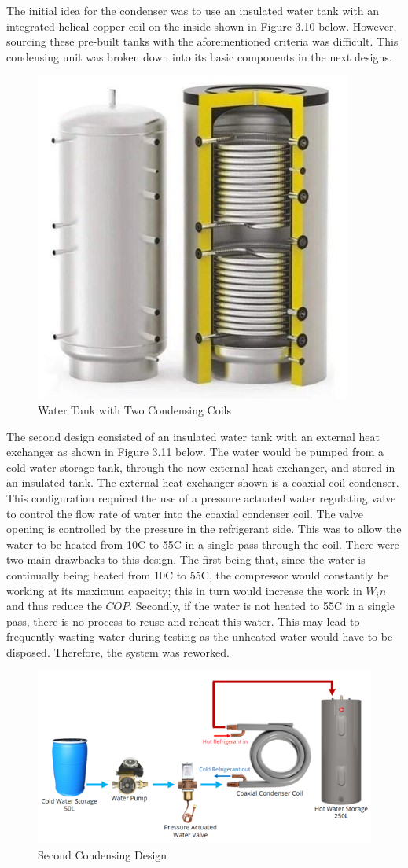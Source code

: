 \medskip
The initial idea for the condenser was to use an insulated water tank with an integrated helical copper coil on the inside shown in Figure 3.10 below. However, sourcing these pre-built tanks with the aforementioned criteria was difficult. This condensing unit was broken down into its basic components in the next designs.

\medskip
\begin{figure}[H]
    \centering
    \includegraphics[width=5 cm]{images/water_tank_condenser.jpg}
    \caption{Water Tank with Two Condensing Coils \cite{water_tank_selection}}
\end{figure}

\medskip
The second design consisted of an insulated water tank with an external heat exchanger as shown in Figure 3.11 below. The water would be pumped from a cold-water storage tank, through the now external heat exchanger, and stored in an insulated tank. The external heat exchanger shown is a coaxial coil condenser. This configuration required the use of a pressure actuated water regulating valve to control the flow rate of water into the coaxial condenser coil. The valve opening is controlled by the pressure in the refrigerant side. This was to allow the water to be heated from 10\textdegree C to 55\textdegree C in a single pass through the coil. There were two main drawbacks to this design. The first being that, since the water is continually being heated from 10\textdegree C to 55\textdegree C, the compressor would constantly be working at its maximum capacity; this in turn would increase the work in $W_in$ and thus reduce the $COP$. Secondly, if the water is not heated to 55\textdegree C in a single pass, there is no process to reuse and reheat this water. This may lead to frequently wasting water during testing as the unheated water would have to be disposed. Therefore, the system was reworked.

\medskip
\begin{figure}[H]
    \centering
    \includegraphics[width=12cm]{images/condensor2.png}
    \caption{Second Condensing Design}
\end{figure}

